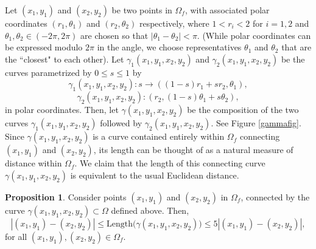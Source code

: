 \documentclass[11pt]{article}
\theoremstyle{definition}
\newtheorem{proposition}{Proposition}[section]
\begin{document}
Let $(x_{1}, y_{1})$ and $(x_{2}, y_{2})$ be two points in $\Omega_{f}$, with associated polar coordinates $(r_{1}, \theta_{1})$ and $(r_{2}, \theta_{2})$ respectively, where $1 < r_{i} < 2$ for $i = 1, 2$ and $\theta_{1}, \theta_{2} \in (-2\pi, 2\pi)$ are chosen so that $|\theta_{1} - \theta_{2}| < \pi$. (While polar coordinates can be expressed modulo $2\pi$ in the angle, we choose representatives $\theta_{1}$ and $\theta_{2}$ that are the ``closest" to each other). Let $\gamma_{1}(x_{1}, y_{1}, x_{2}, y_{2})$ and $\gamma_{2}(x_{1}, y_{1}, x_{2}, y_{2})$ be the curves parametrized by $0 \le s \le 1$ by
\begin{equation*}
\gamma_{1}(x_{1}, y_{1}, x_{2}, y_{2}): s \to ((1 - s)r_{1} + sr_{2}, \theta_{1}),
\end{equation*}
\begin{equation*}
\gamma_{2}(x_{1}, y_{1}, x_{2}, y_{2}): (r_{2}, (1 - s)\theta_{1} + s\theta_{2}),
\end{equation*}
in polar coordinates. Then, let $\gamma(x_{1}, y_{1}, x_{2}, y_{2})$ be the composition of the two curves $\gamma_{1}(x_{1}, y_{1}, x_{2}, y_{2})$ followed by $\gamma_{2}(x_{1}, y_{1}, x_{2}, y_{2})$. See Figure \ref{gammafig}. Since $\gamma(x_{1}, y_{1}, x_{2}, y_{2})$ is a curve contained entirely within $\Omega_{f}$ connecting $(x_{1}, y_{1})$ and $(x_{2}, y_{2})$, its length can be thought of as a natural measure of distance within $\Omega_{f}$. We claim that the length of this connecting curve $\gamma(x_{1}, y_{1}, x_{2}, y_{2})$ is equivalent to the usual Euclidean distance.

\begin{proposition}\label{gammaprop}
Consider points $(x_{1}, y_{1})$ and $(x_{2}, y_{2})$ in $\Omega_{f}$, connected by the curve $\gamma(x_{1}, y_{1}, x_{2}, y_{2}) \subset \Omega$ defined above. Then,
\begin{equation*}
|(x_{1}, y_{1}) - (x_{2}, y_{2})| \le \text{Length}\Big(\gamma(x_{1}, y_{1}, x_{2}, y_{2})\Big) \le 5|(x_{1}, y_{1}) - (x_{2}, y_{2})|,
\end{equation*}
for all $(x_{1}, y_{1}), (x_{2}, y_{2}) \in \Omega_{f}$. 
\end{proposition} 
\end{document}

